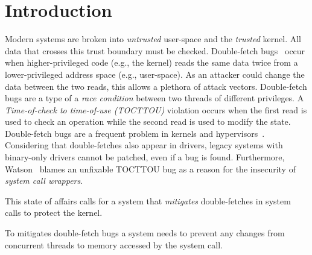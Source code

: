 \documentclass[conference]{IEEEtran}
\begin{document}
\section{Introduction}

Modern systems are broken into \emph{untrusted} user-space and the
\emph{trusted} kernel.  All data that crosses this trust boundary must be
checked.  Double-fetch bugs~\cite{serna08doublefetch, twizsgrakky07ring0,
wilhelm2016xenpwn, wang2018survey} occur when higher-privileged code (e.g., the
kernel) reads the same data twice from a lower-privileged address space (e.g.,
user-space). As an attacker could change the data between the two reads, this
allows a plethora of attack vectors.  Double-fetch bugs are a type of a
\emph{race condition} between two threads of different privileges. A
\emph{Time-of-check to time-of-use (TOCTTOU)} violation occurs when the first
read is used to check an operation while the second read is used to modify the
state.  Double-fetch bugs are a frequent problem in kernels and
hypervisors~\cite{cve201812633, cve202012652, cve20131332, cve201920610,
cve20158550, cve201610439, cve201610435, cve201610433, cve20195519,
cve20168438}. Considering that double-fetches also appear in drivers, legacy
systems with binary-only drivers cannot be patched, even if a bug is found.
Furthermore, Watson~\cite{watson2007exploiting} blames an unfixable TOCTTOU bug
as a reason for the insecurity of \emph{system call wrappers}.  

This state of affairs calls for a system that \emph{mitigates} double-fetches in
system calls to protect the kernel.

To mitigates double-fetch bugs a system needs to prevent any changes from
concurrent threads to memory accessed by the system call.
\end{document}
